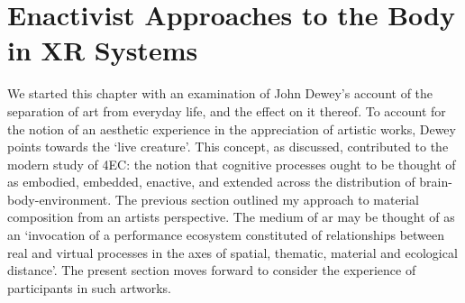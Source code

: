 \section{Enactivist Approaches to the Body in XR Systems}\label{sec: theory-embodiment}
We started this chapter with an examination of John Dewey's account of the separation of art from everyday life, and the effect on it thereof. To account for the notion of an aesthetic experience in the appreciation of artistic works, Dewey points towards the `live creature'. This concept, as discussed, contributed to the modern study of 4EC: the notion that cognitive processes ought to be thought of as embodied, embedded, enactive, and extended across the distribution of brain-body-environment. The previous section outlined my approach to material composition from an artists perspective. The medium of \gls{ar} may be thought of as an `invocation of a performance ecosystem constituted of relationships between real and virtual processes in the axes of spatial, thematic, material and ecological distance'. The present section moves forward to consider the experience of participants in such artworks.

